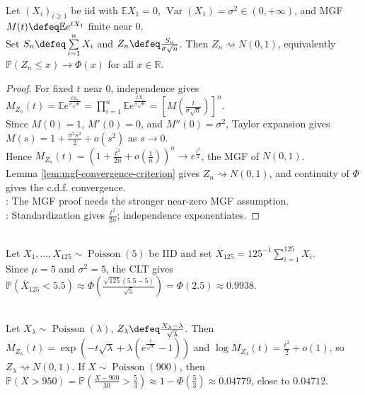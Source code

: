 \begin{proposition} \label{prop:mgf-proof-clt-near-zero} \\
Let $(X_i)_{i\geq1}$ be iid with $\mathbb{E}X_1=0$, $\operatorname{Var}(X_1)=\sigma^2\in(0,+\infty)$, and MGF $M(t)\defeq\mathbb{E}e^{tX_1}$ finite near $0$.\\
Set $S_n\defeq\sum\limits_{i=1}^{n}X_i$ and $Z_n\defeq \frac{S_n}{\sigma\sqrt{n}}$. Then $Z_n\rightsquigarrow N(0,1)$, equivalently $\mathbb{P}(Z_n\leq x)\to\Phi(x)$ for all $x\in\mathbb{R}$.
\begin{proof}
For fixed $t$ near $0$, independence gives $M_{Z_n}(t)=\mathbb{E}e^{\frac{tS_n}{\sigma\sqrt{n}}}=\prod\limits_{i=1}^{n}\mathbb{E}e^{\frac{tX_i}{\sigma\sqrt{n}}}=[M(\frac{t}{\sigma\sqrt{n}})]^n$.\\
Since $M(0)=1$, $M'(0)=0$, and $M''(0)=\sigma^2$, Taylor expansion gives $M(s)=1+\frac{\sigma^2s^2}{2}+o(s^2)$ as $s\to0$.\\
Hence $M_{Z_n}(t)=(1+\frac{t^2}{2n}+o(\frac{1}{n}))^n\to e^{\frac{t^2}{2}}$, the MGF of $N(0,1)$.\\
Lemma \ref{lem:mgf-convergence-criterion} gives $Z_n\rightsquigarrow N(0,1)$, and continuity of $\Phi$ gives the c.d.f. convergence.\\
: The MGF proof needs the stronger near-zero MGF assumption.\\
: Standardization gives $\frac{t^2}{2n}$; independence exponentiates.
\end{proof}
\end{proposition}

\begin{example} \label{ex:clt-poisson-program-errors} \\
Let $X_1,\ldots,X_{125}\sim\operatorname{Poisson}(5)$ be IID and set $\overline{X}_{125}=125^{-1}\sum\limits_{i=1}^{125}X_i$.\\
Since $\mu=5$ and $\sigma^2=5$, the CLT gives $\mathbb{P}(\overline{X}_{125}<5.5)\approx\Phi(\frac{\sqrt{125}(5.5-5)}{\sqrt5})=\Phi(2.5)\approx0.9938$.
\end{example}

\begin{example} \label{ex:standardized-poisson-normal-limit} \\
Let $X_\lambda\sim\operatorname{Poisson}(\lambda)$, $Z_\lambda\defeq\frac{X_\lambda-\lambda}{\sqrt{\lambda}}$. Then $M_{Z_\lambda}(t)=\exp(-t\sqrt{\lambda}+\lambda(e^{\frac{t}{\sqrt{\lambda}}}-1))$ and $\log M_{Z_\lambda}(t)=\frac{t^2}{2}+o(1)$, so $Z_\lambda\rightsquigarrow N(0,1)$. If $X\sim\operatorname{Poisson}(900)$, then $\mathbb{P}(X>950)=\mathbb{P}(\frac{X-900}{30}>\frac{5}{3})\approx1-\Phi(\frac{5}{3})\approx0.04779$, close to $0.04712$.
\end{example}

